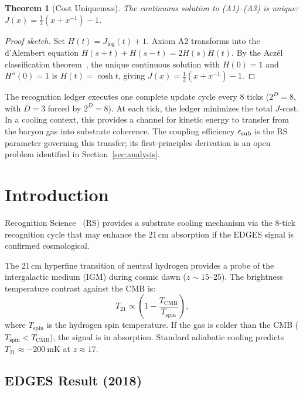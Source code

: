\documentclass[12pt,a4paper]{article}
\newtheorem{theorem}{Theorem}[section]
\theoremstyle{definition}
\theoremstyle{remark}
\begin{document}
\begin{theorem}[Cost Uniqueness]
\label{thm:unique}
The continuous solution to \textup{(A1)--(A3)} is unique:
$J(x) = \tfrac{1}{2}(x + x^{-1}) - 1$.
\end{theorem}

\begin{proof}[Proof sketch]
Set $H(t) = J_{\log}(t)+1$.  Axiom A2 transforms into the d'Alembert
equation $H(s+t)+H(s-t)=2H(s)H(t)$.  By the Acz\'el classification
theorem~\cite{Aczel1966}, the unique continuous solution with $H(0)=1$
and $H''(0)=1$ is $H(t)=\cosh t$, giving
$J(x)=\tfrac{1}{2}(x+x^{-1})-1$.
\end{proof}

\noindent The recognition ledger executes one complete update cycle every
8 ticks ($2^D = 8$, with $D = 3$ forced by $2^D = 8$).  At each tick,
the ledger minimizes the total $J$-cost.  In a cooling context, this
provides a channel for kinetic energy to transfer from the baryon gas
into substrate coherence.  The coupling efficiency $\epsilon_{\rm sub}$
is the RS parameter governing this transfer; its first-principles
derivation is an open problem identified in Section~\ref{sec:analysis}.

\section{Introduction}
\label{sec:intro}

Recognition Science~\cite{RS_Axioms} (RS) provides a substrate cooling
mechanism via the 8-tick recognition cycle that may enhance the 21\,cm
absorption if the EDGES signal is confirmed cosmological.

The 21\,cm hyperfine transition of neutral hydrogen provides a probe
of the intergalactic medium (IGM) during cosmic dawn ($z \sim 15$--$25$).
The brightness temperature contrast against the CMB is:
\begin{equation}
  T_{21} \propto \left(1 - \frac{T_{\mathrm{CMB}}}{T_{\mathrm{spin}}}\right),
\end{equation}
where $T_{\mathrm{spin}}$ is the hydrogen spin temperature.  If the
gas is colder than the CMB ($T_{\mathrm{spin}} < T_{\mathrm{CMB}}$),
the signal is in absorption.  Standard adiabatic cooling predicts
$T_{21} \approx -200~\mathrm{mK}$ at $z \approx 17$.

\subsection{EDGES Result (2018)}
\end{document}
